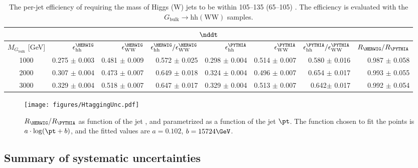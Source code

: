 \begin{sidewaystable}[!htb]
  \begin{center}
\caption{The per-jet efficiency of requiring the mass of Higgs (W) jets to
be within 105--135 (65--105) \GeV. The efficiency is evaluated with the $G_\mathrm{bulk}\rightarrow \mathrm{hh} (\mathrm{WW})$ samples.\label{tab:WideWindow}}
  \begin{tabular}{c|rrrrrrr}
\hline\hline
\multicolumn{8}{c}{$\nddt$ } \\
\hline
$M_{G_\mathrm{bulk}}$ [GeV] &  $\epsilon_{\mathrm{hh}}^{\HERWIG}$ &  $\epsilon_{\mathrm{WW}}^{\HERWIG}$ & $\epsilon_{\mathrm{hh}}^{\HERWIG}/\epsilon_{\mathrm{WW}}^{\HERWIG}$
                                         &  $\epsilon_{\mathrm{hh}}^{\PYTHIA}$ &  $\epsilon_{\mathrm{WW}}^{\PYTHIA}$ &  $\epsilon_{\mathrm{hh}}^{\PYTHIA}/\epsilon_{\mathrm{WW}}^{\PYTHIA}$ &  $R_{\HERWIG}/R_{\PYTHIA}$ \\
\hline
1000 & 0.275 $\pm$ 0.003 & 0.481 $\pm$ 0.009 & 0.572 $\pm$ 0.025 & 0.298 $\pm$ 0.004 & 0.514 $\pm$ 0.007 & 0.580 $\pm$ 0.016 & 0.987 $\pm$ 0.058 \\
2000 & 0.307 $\pm$ 0.004 & 0.473 $\pm$ 0.007 & 0.649 $\pm$ 0.018 & 0.324 $\pm$ 0.004 & 0.496 $\pm$ 0.007 & 0.654 $\pm$ 0.017 & 0.993 $\pm$ 0.055 \\
3000 & 0.329 $\pm$ 0.004 & 0.518 $\pm$ 0.007 & 0.647 $\pm$ 0.017 & 0.329 $\pm$ 0.004 & 0.513 $\pm$ 0.007 & 0.642$\pm$ 0.017 & 0.992 $\pm$ 0.054 \\

\hline
\hline

\end{tabular}
\end{center}
\end{sidewaystable}


\begin{figure}[!htb]
 \centering
   \texttt{[image: figures/HtaggingUnc.pdf]}
 \caption{ $R_{\HERWIG}
/R_{\PYTHIA}$ as function of the jet \pt, and parametrized as a function of the jet $\pt$. The function chosen to fit the points is $a\cdot \log(\pt + b)$, and the fitted values are $a =0.102$, $b =15724\GeV$.}
 \label{fig:ratioHP}
\end{figure}




\clearpage
\subsection{Summary of systematic uncertainties}

